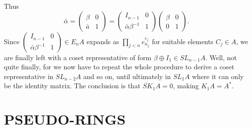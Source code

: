 Thus
\[\bar{\alpha}=\begin{pmatrix} \beta & 0 \\ \bar{a} &  1 \end{pmatrix}=\begin{pmatrix} I_{n-1} & 0 \\ \bar{\alpha}\beta^{-1} &  1 \end{pmatrix}\begin{pmatrix} \beta & 0 \\ 0 &  1 \end{pmatrix}.\]
Since $\begin{pmatrix} I_{n-1} & 0 \\ \bar{\alpha}\beta^{-1} &  1 \end{pmatrix}\in E_n A$ expands as $\prod_{j<n}e_{n_j}^{c_j}$ for suitable elements $C_j\in A$, we are finally left with a coset representative of form $\beta \oplus I_1 \in SL_{n-1}A$. Well, not quite finally, for we now have to repeat the whole procedure to derive a coset representative in $SL_{n-2} A$ and so on, until ultimately in $SL_1A$ where it can only be the identity matrix. The conclusion is that $SK_1A=0$, making $K_1A=A^*$.

\section*{PSEUDO-RINGS}

